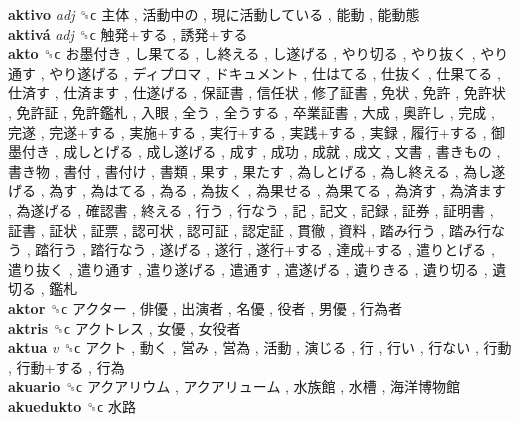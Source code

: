 \textbf{aktivo} \emph{adj}  ␝ϲ   主体 ,  活動中の ,  現に活動している ,  能動 ,  能動態   \\
\textbf{aktivá} \emph{adj}  ␝ϲ   触発+する ,  誘発+する   \\
\textbf{akto} ␝ϲ   お墨付き ,  し果てる ,  し終える ,  し遂げる ,  やり切る ,  やり抜く ,  やり通す ,  やり遂げる ,  ディプロマ ,  ドキュメント ,  仕はてる ,  仕抜く ,  仕果てる ,  仕済す ,  仕済ます ,  仕遂げる ,  保証書 ,  信任状 ,  修了証書 ,  免状 ,  免許 ,  免許状 ,  免許証 ,  免許鑑札 ,  入眼 ,  全う ,  全うする ,  卒業証書 ,  大成 ,  奥許し ,  完成 ,  完遂 ,  完遂+する ,  実施+する ,  実行+する ,  実践+する ,  実録 ,  履行+する ,  御墨付き ,  成しとげる ,  成し遂げる ,  成す ,  成功 ,  成就 ,  成文 ,  文書 ,  書きもの ,  書き物 ,  書付 ,  書付け ,  書類 ,  果す ,  果たす ,  為しとげる ,  為し終える ,  為し遂げる ,  為す ,  為はてる ,  為る ,  為抜く ,  為果せる ,  為果てる ,  為済す ,  為済ます ,  為遂げる ,  確認書 ,  終える ,  行う ,  行なう ,  記 ,  記文 ,  記録 ,  証券 ,  証明書 ,  証書 ,  証状 ,  証票 ,  認可状 ,  認可証 ,  認定証 ,  貫徹 ,  資料 ,  踏み行う ,  踏み行なう ,  踏行う ,  踏行なう ,  遂げる ,  遂行 ,  遂行+する ,  達成+する ,  遣りとげる ,  遣り抜く ,  遣り通す ,  遣り遂げる ,  遣通す ,  遣遂げる ,  遺りきる ,  遺り切る ,  遺切る ,  鑑札   \\
\textbf{aktor} ␝ϲ   アクター ,  俳優 ,  出演者 ,  名優 ,  役者 ,  男優 ,  行為者   \\
\textbf{aktris} ␝ϲ   アクトレス ,  女優 ,  女役者   \\
\textbf{aktua} \emph{v}  ␝ϲ   アクト ,  動く ,  営み ,  営為 ,  活動 ,  演じる ,  行 ,  行い ,  行ない ,  行動 ,  行動+する ,  行為   \\
\textbf{akuario} ␝ϲ   アクアリウム ,  アクアリューム ,  水族館 ,  水槽 ,  海洋博物館   \\
\textbf{akuedukto} ␝ϲ   水路   \\

